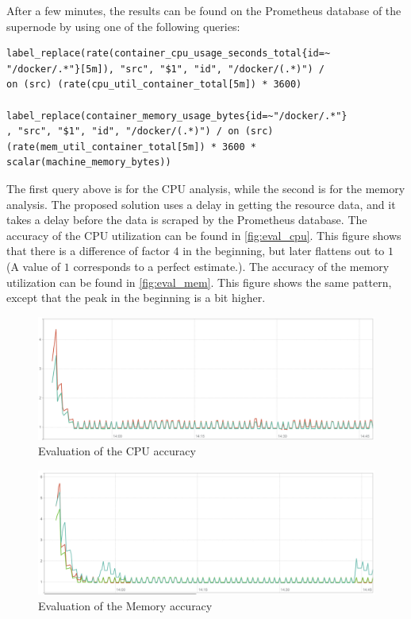 \noindent
After a few minutes, the results can be found on the Prometheus database of the supernode by using one of the following queries:

\begin{verbatim}
label_replace(rate(container_cpu_usage_seconds_total{id=~
"/docker/.*"}[5m]), "src", "$1", "id", "/docker/(.*)") / 
on (src) (rate(cpu_util_container_total[5m]) * 3600)

label_replace(container_memory_usage_bytes{id=~"/docker/.*"}
, "src", "$1", "id", "/docker/(.*)") / on (src)
(rate(mem_util_container_total[5m]) * 3600 * 
scalar(machine_memory_bytes))
\end{verbatim}

\noindent
The first query above is for the CPU analysis, while the second is for the memory analysis. The proposed solution uses a delay in getting the resource data, and it takes a delay before the data is scraped by the Prometheus database. The accuracy of the CPU utilization can be found in \autoref{fig:eval_cpu}. This figure shows that there is a difference of factor $4$ in the beginning, but later flattens out to $1$ (A value of $1$ corresponds to a perfect estimate.). The accuracy of the memory utilization can be found in \autoref{fig:eval_mem}. This figure shows the same pattern, except that the peak in the beginning is a bit higher.\\

\begin{figure}
    \centering
    \includegraphics[width=\textwidth]{gfx/eval_cpu}
    \caption{Evaluation of the CPU accuracy}
    \label{fig:eval_cpu}
\end{figure}

\begin{figure}
    \centering
    \includegraphics[width=\textwidth]{gfx/eval_mem}
    \caption{Evaluation of the Memory accuracy}
    \label{fig:eval_mem}
\end{figure}

